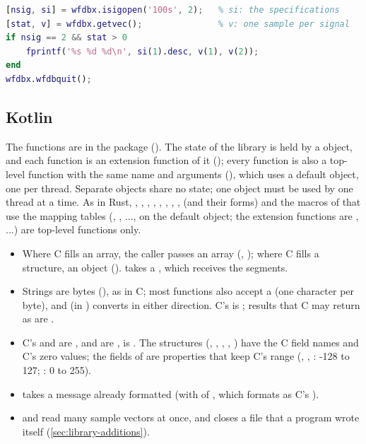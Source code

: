 \begin{lstlisting}[language=Matlab,style=example]
[nsig, si] = wfdbx.isigopen('100s', 2);   % si: the specifications
[stat, v] = wfdbx.getvec();               % v: one sample per signal
if nsig == 2 && stat > 0
    fprintf('%s %d %d\n', si(1).desc, v(1), v(2));
end
wfdbx.wfdbquit();
\end{lstlisting}

\subsection{Kotlin}
\label{sec:library-kotlin}

The functions are in the package  (). The
state of the library is held by a  object, and each function is an
extension function of it (); every function is also a
top-level function with the same name and arguments
(), which uses a default  object, one per
thread. Separate  objects share no state; one object must be used
by one thread at a time. As in Rust, , ,
, , ,
, , ,
 (and their  forms) and the macros of
 that use the mapping tables (,
, ..., on the default object; the extension functions are
, ...) are top-level functions only.

\begin{itemize}
\item Where C fills an array, the caller passes an array
  (, ); where C fills a structure, an
  object ().  takes a
  , which receives the segments.
\item Strings are bytes (), as in C; most functions also
  accept a  (one character per byte), and  (in
  ) converts in either direction. C's  is
  ; results that C may return as  are
  .
\item C's  and  are ,  and
   are ,  is . The
  structures (, , ,
  , ) have the C field names and C's zero values;
  the  fields of  are  properties that
  keep C's range (, , : -128 to 127;
  : 0 to 255).
\item {} takes a message already formatted (with
   of , which formats as C's ).
\item {} and  read many sample vectors at
  once, and  closes a file that a program wrote
  itself (\cref{sec:library-additions}).
\end{itemize}

